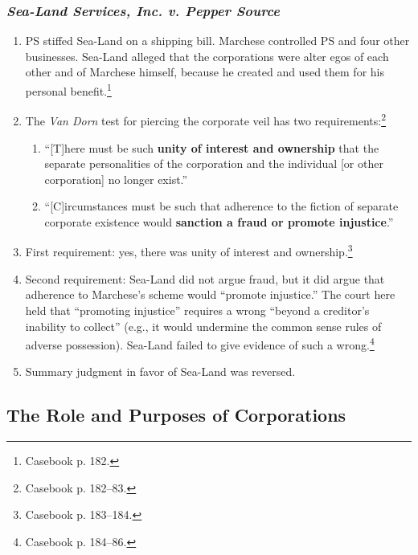 \subsubsection{\emph{Sea-Land Services, Inc. v. Pepper Source}}

\begin{enumerate}
    \item PS stiffed Sea-Land on a shipping bill. Marchese controlled PS and 
    four other businesses. Sea-Land alleged that the corporations were alter 
    egos of each other and of Marchese himself, because he created and used 
    them for his personal benefit.\footnote{Casebook p. 182.}
    \item The \emph{Van Dorn} test for piercing the corporate veil has two 
    requirements:\footnote{Casebook p. 182--83.}
    \begin{enumerate}
        \item ``[T]here must be such \textbf{unity of interest and ownership} 
        that the separate personalities of the corporation and the individual 
        [or other corporation] no longer exist.''
        \item ``[C]ircumstances must be such that adherence to the fiction of 
        separate corporate existence would \textbf{sanction a fraud or promote 
        injustice}.''
    \end{enumerate}
    \item First requirement: yes, there was unity of interest and 
    ownership.\footnote{Casebook p. 183--184.}
    \item Second requirement: Sea-Land did not argue fraud, but it did argue 
    that adherence to Marchese's scheme would ``promote injustice.'' The court 
    here held that ``promoting injustice'' requires a wrong ``beyond a 
    creditor's inability to collect'' (e.g., it would undermine the common 
    sense rules of adverse possession). Sea-Land failed to give evidence of 
    such a wrong.\footnote{Casebook p. 184--86.}
    \item Summary judgment in favor of Sea-Land was reversed.
\end{enumerate}



\newpage %

\subsection{The Role and Purposes of Corporations}


